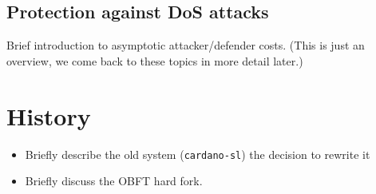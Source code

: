 \duncan

\subsection{Protection against DoS attacks}

Brief introduction to asymptotic attacker/defender costs. (This is just an
overview, we come back to these topics in more detail later.)

\duncan

\section{History}
\label{overview:history} %

\duncan

\begin{itemize}
\item Briefly describe the old system (\lstinline!cardano-sl!) the decision
to rewrite it
\item Briefly discuss the OBFT hard fork.
\end{itemize}
